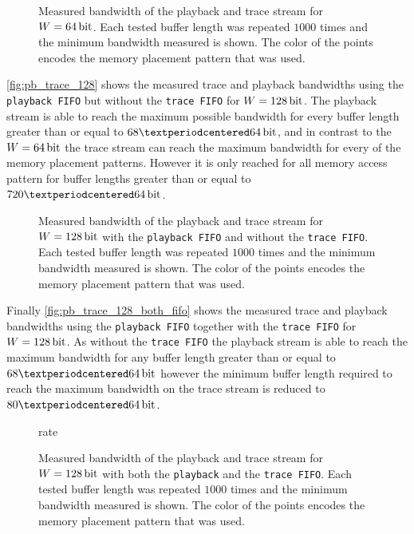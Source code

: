 \begin{figure}[H]
\caption{Measured bandwidth of the playback and trace stream for $W = \SI{64}{\bit}$. Each tested buffer length was repeated $\num{1000}$ times and the minimum bandwidth measured is shown. The color of the points encodes the memory placement pattern that was used.}\label{fig:pb_trace_64}
\end{figure}

\autoref{fig:pb_trace_128} shows the measured trace and playback bandwidths using the \texttt{playback FIFO} but without the \texttt{trace FIFO} for $W = \SI{128}{\bit}$. The playback stream is able to reach the maximum possible bandwidth for every buffer length greater than or equal to $\num{68} · \PhyWordSize$, and in contrast to the $W = \SI{64}{\bit}$ the trace stream can reach the maximum bandwidth for every of the memory placement patterns. However it is only reached for all memory access pattern for buffer lengths greater than or equal to $\num{720} · \PhyWordSize$.
\begin{figure}[H]
\caption{Measured bandwidth of the playback and trace stream for $W = \SI{128}{\bit}$ with the \texttt{playback FIFO} and without the \texttt{trace FIFO}. Each tested buffer length was repeated $\num{1000}$ times and the minimum bandwidth measured is shown. The color of the points encodes the memory placement pattern that was used.}\label{fig:pb_trace_128}
\end{figure}

Finally \autoref{fig:pb_trace_128_both_fifo} shows the measured trace and playback bandwidths using the \texttt{playback FIFO} together with the \texttt{trace FIFO} for $W = \SI{128}{\bit}$. As without the \texttt{trace FIFO} the playback stream is able to reach the maximum bandwidth for any buffer length greater than or equal to $\num{68} · \PhyWordSize$ however the minimum buffer length required to reach the maximum bandwidth on the trace stream is reduced to $80 · \PhyWordSize$.

\begin{figure}[H]
\caption{rate}
\caption{Measured bandwidth of the playback and trace stream for $W = \SI{128}{\bit}$ with both the \texttt{playback} and the \texttt{trace FIFO}. Each tested buffer length was repeated $\num{1000}$ times and the minimum bandwidth measured is shown. The color of the points encodes the memory placement pattern that was used.}\label{fig:pb_trace_128_both_fifo}
\end{figure}

